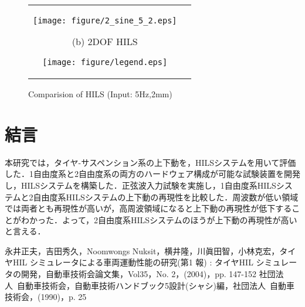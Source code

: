 \documentclass{article_vdlab_sotsuron_youshi}
\begin{document}
\vspace*{-3mm}
\begin{figure}[H]
  \hspace*{9mm}
  \begin{tabular}{cc}
  \begin{minipage}{0.7\hsize}
    \begin{center} 
      \texttt{[image: figure/2\_sine\_5\_2.eps]}
      \end{center}
      \begin{center}
      \vspace*{-6mm}
      \ (b) 2DOF HILS\
    \end{center}
  \end{minipage}
  \begin{minipage}{0.3\hsize}
    \hspace*{-12mm}
    \texttt{[image: figure/legend.eps]}
  \end{minipage}
  \end{tabular}
  \vspace*{1mm}
  \caption{Comparision of HILS (Input: 5Hz,2mm)}
  \label{fig:compare_5_2}
\end{figure}

 \vspace*{-2mm}
\section{結言}
本研究では，タイヤ-サスペンション系の上下動を，HILSシステムを用いて評価した．1自由度系と2自由度系の両方のハードウェア構成が可能な試験装置を開発し，HILSシステムを構築した．正弦波入力試験を実施し，1自由度系HILSシステムと2自由度系HILSシステムの上下動の再現性を比較した．周波数が低い領域では両者とも再現性が高いが，高周波領域になると上下動の再現性が低下することがわかった．よって，2自由度系HILSシステムのほうが上下動の再現性が高いと言える．

\begin{thebibliography}{9}
  永井正夫，吉田秀久，Noomwongs Nuksit，横井隆，川眞田智，小林克宏，タイヤHIL シミュレータによる車両運動性能の研究(第1 報) : タイヤHIL シミュレータの開発，自動車技術会論文集，Vol35，No. 2，(2004)，pp. 147-152
  \bibitem{7}社団法人\ 自動車技術会，自動車技術ハンドブック5設計(シャシ)編，社団法人\ 自動車技術会，(1990)，p. 25
\end{thebibliography}
\end{document}
